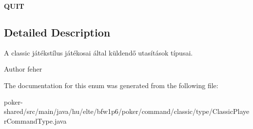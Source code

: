 \begin{DoxyCompactItemize}
\item 
\hypertarget{enumhu_1_1elte_1_1bfw1p6_1_1poker_1_1command_1_1classic_1_1type_1_1_classic_player_command_type_a828b38643e019bca027b6af6db03d900}{}{\bfseries Q\+U\+I\+T}\label{enumhu_1_1elte_1_1bfw1p6_1_1poker_1_1command_1_1classic_1_1type_1_1_classic_player_command_type_a828b38643e019bca027b6af6db03d900}

\end{DoxyCompactItemize}


\subsection{Detailed Description}
A classic játékstílus játékosai által küldendő utasítások típusai. \begin{DoxyAuthor}{Author}
feher 
\end{DoxyAuthor}


The documentation for this enum was generated from the following file\+:\begin{DoxyCompactItemize}
\item 
poker-\/shared/src/main/java/hu/elte/bfw1p6/poker/command/classic/type/Classic\+Player\+Command\+Type.\+java\end{DoxyCompactItemize}
